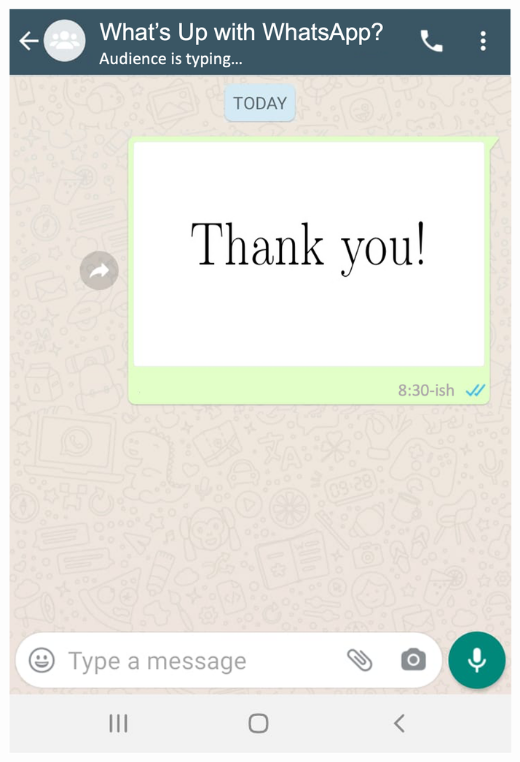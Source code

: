 \documentclass[usenames,dvipsnames,t]{beamer}
\begin{document}
\begin{frame}[plain]
\vspace{.6cm}
\centering 
\includegraphics[scale=.6]{thanks_apsa_clear}
\end{frame}
\end{document}
